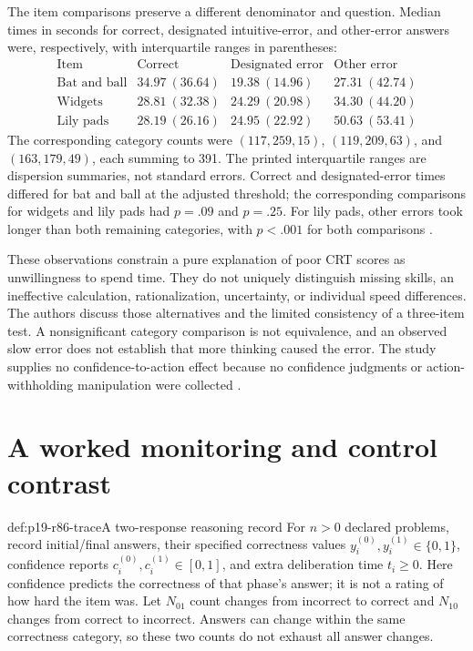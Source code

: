 The item comparisons preserve a different denominator and question. Median
times in seconds for correct, designated intuitive-error, and other-error
answers were, respectively, with interquartile ranges in parentheses:
\[
\begin{array}{l|rrr}
 \text{Item}&\text{Correct}&\text{Designated error}&\text{Other error}\\\hline
 \text{Bat and ball}&34.97\ (36.64)&19.38\ (14.96)&27.31\ (42.74)\\
 \text{Widgets}&28.81\ (32.38)&24.29\ (20.98)&34.30\ (44.20)\\
 \text{Lily pads}&28.19\ (26.16)&24.95\ (22.92)&50.63\ (53.41)
\end{array}
\]
The corresponding category counts were \((117,259,15)\),
\((119,209,63)\), and \((163,179,49)\), each summing to 391.
The printed interquartile ranges are dispersion summaries, not standard
errors. Correct and designated-error times differed for bat and ball
at the adjusted threshold; the corresponding comparisons for widgets and
lily pads had \(p=.09\) and \(p=.25\). For lily pads, other errors
took longer than both remaining categories, with \(p<.001\) for both
comparisons \cite[pp.~10--12, tables~4--5]{StuppleEtAl2017Slower}.

These observations constrain a pure explanation of poor CRT scores as
unwillingness to spend time. They do not uniquely distinguish missing skills,
an ineffective calculation, rationalization, uncertainty, or individual speed
differences. The authors discuss those alternatives and the limited consistency
of a three-item test. A nonsignificant category comparison is not equivalence,
and an observed slow error does not establish that more thinking caused the
error. The study supplies no confidence-to-action effect because no confidence
judgments or action-withholding manipulation were collected
\cite[pp.~12--15]{StuppleEtAl2017Slower}.

\section{A worked monitoring and control contrast}
\label{sec:p19-r86-worked}

\begin{hbdefinition}{def:p19-r86-trace}{A two-response reasoning record}
For \(n>0\) declared problems, record initial/final answers, their specified
correctness values \(y_i^{(0)},y_i^{(1)}\in\{0,1\}\), confidence
reports \(c_i^{(0)},c_i^{(1)}\in[0,1]\), and extra deliberation time
\(t_i\geq0\). Here confidence predicts the correctness of that phase's
answer; it is not a rating of how hard the item was. Let \(N_{01}\)
count changes from incorrect to correct and \(N_{10}\) changes from
correct to incorrect. Answers can change within the same correctness category,
so these two counts do not exhaust all answer changes.
\end{hbdefinition}

